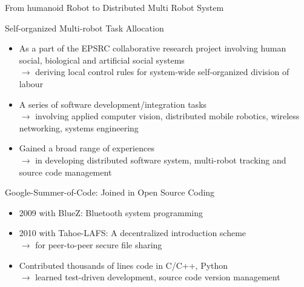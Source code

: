 \documentclass{beamer}
\begin{document}
\begin{frame}{From humanoid Robot to Distributed Multi Robot System}
\begin{block}{Self-organized Multi-robot Task Allocation}
\begin{itemize}
\item \small \alert{As a part of the EPSRC collaborative research project} involving human social, biological and artificial social systems\\ 
$\rightarrow$ \scriptsize deriving local control rules for system-wide self-organized division of labour
\item \small \alert{A series of software development/integration tasks}\\
$\rightarrow$ \scriptsize involving applied computer vision, distributed mobile robotics, wireless networking, systems engineering  
\item \small  Gained \alert{a broad range of experiences}\\ 
$\rightarrow$ \scriptsize in developing distributed software system, multi-robot tracking and source code management
\end{itemize}
\end{block}
\begin{block}{Google-Summer-of-Code: Joined in Open Source Coding}
\begin{itemize}
\item \small \alert{2009 with BlueZ:} Bluetooth system programming
\item \small \alert{2010 with Tahoe-LAFS:} A decentralized introduction scheme\\
$\rightarrow$ \scriptsize for peer-to-peer secure file sharing
\item \small \alert{Contributed thousands of lines code} in C/C++, Python\\
$\rightarrow$ \scriptsize learned test-driven development, source code version management
\end{itemize}
\end{block}
\end{frame}
\end{document}
